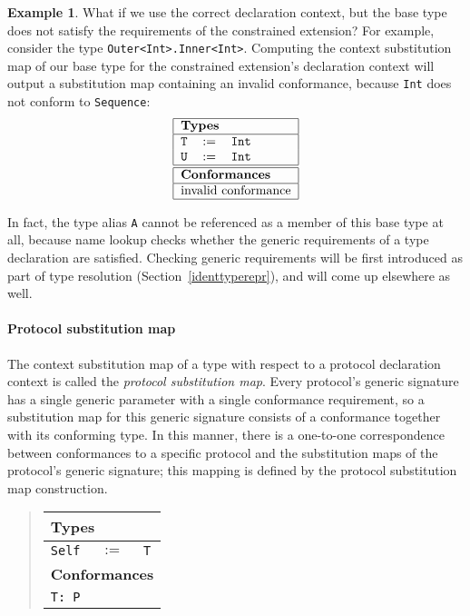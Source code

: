 \documentclass[a4paper,headsepline,bibliography=totoc,toc=flat,fleqn,twoside=semi]{scrbook}
\theoremstyle{definition}
\theoremstyle{definition}
\newtheorem{example}{Example}[chapter]
\theoremstyle{definition}
\newcommand{\SubMapC}[2]{\begin{tabular}{|lll|}
\hline
\multicolumn{3}{|l|}{\textbf{Types}}\\
\hline
#1\\
\hline
\hline
\multicolumn{3}{|l|}{\textbf{Conformances}}\\
\hline
#2\\
\hline
\end{tabular}}
\newcommand{\SubType}[2]{\texttt{#1}&$:=$&\texttt{#2}}
\newcommand{\SubConf}[1]{\multicolumn{3}{|l|}{\texttt{#1}}}
\begin{document}
\begin{example} What if we use the correct declaration context, but the base type does not satisfy the requirements of the constrained extension? For example, consider the type \texttt{Outer<Int>.Inner<Int>}. Computing the context substitution map of our base type for the constrained extension's declaration context will output a substitution map containing an invalid conformance, because \texttt{Int} does not conform to \texttt{Sequence}:
\[
\SubMapC{
\SubType{T}{Int}\\
\SubType{U}{Int}
}{
\multicolumn{3}{|l|}{invalid conformance}
}
\]
\end{example}
In fact, the type alias \texttt{A} cannot be referenced as a member of this base type at all, because name lookup checks whether the generic requirements of a type declaration are satisfied. Checking generic requirements will be first introduced as part of type resolution (Section~\ref{identtyperepr}), and will come up elsewhere as well.
\paragraph{Protocol substitution map}
The context substitution map of a type with respect to a protocol declaration context is called the \emph{protocol substitution map}. Every protocol's generic signature has a single generic parameter with a single conformance requirement, so a substitution map for this generic signature consists of a conformance together with its conforming type. In this manner, there is a one-to-one correspondence between conformances to a specific protocol and the substitution maps of the protocol's generic signature; this mapping is defined by the protocol substitution map construction.
\begin{quote}
\SubMapC{
\SubType{Self}{T}
}{
\SubConf{T:~P}
}
\end{quote}
\end{document}
